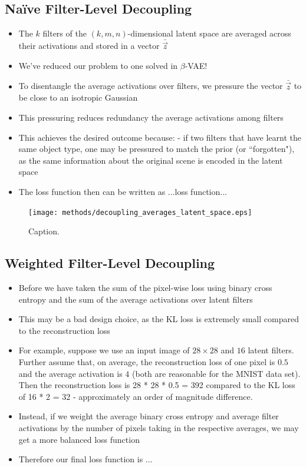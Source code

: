 \subsection{Na{\"i}ve Filter-Level Decoupling}
\begin{itemize}
\item The $k$ filters of the $(k, m, n)$-dimensional latent space are averaged across their activations and stored in a vector $\bar{\vec{z}}$
\item We've reduced our problem to one solved in $\beta$-VAE!
\item To disentangle the average activations over filters, we pressure the vector $\bar{\vec{z}}$ to be close to an isotropic Gaussian
\item This pressuring reduces redundancy the average activations among filters
\item This achieves the desired outcome because: - if two filters that have learnt the same object type, one may be pressured to match the prior (or ``forgotten"), as the same information about the original scene is encoded in the latent space
\item The loss function then can be written as ...loss function...
\end{itemize}

\begin{figure}[H]
\centering
\captionsetup{justification=centering}
\texttt{[image: methods/decoupling\_averages\_latent\_space.eps]}
\caption{Caption.}
\label{fig:decoupling_averages_latent_space}
\end{figure}

%
%
\subsection{Weighted Filter-Level Decoupling}

\begin{itemize}
\item Before we have taken the sum of the pixel-wise loss using binary cross entropy and the sum of the average activations  over latent filters
\item This may be a bad design choice, as the KL loss is extremely small compared to the reconstruction loss
\item For example, suppose we use an input image of $28 \times 28$ and $16$ latent filters. Further assume that, on average, the reconstruction loss of one pixel is $0.5$ and the average activation is $4$ (both are reasonable for the MNIST data set). Then the reconstruction loss is 28 * 28 * 0.5 = 392 compared to the KL loss of 16 * 2 = 32 - approximately an order of magnitude difference.
\item Instead, if we weight the average binary cross entropy and average filter activations by the number of pixels taking in the respective averages, we may get a more balanced loss function 
\item Therefore our final loss function is ...
\end{itemize}

